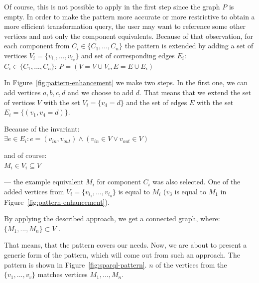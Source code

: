 Of course, this is not possible to apply in the first step since the graph $P$ is empty. 
In order to make the pattern more accurate or more restrictive to obtain a more 
efficient transformation query, the user may want to reference some other 
vertices and not only the component equivalents.
Because of that observation, for each component from $C_i \in \{C_1 ,..., C_n\}$ the pattern is 
extended by adding a set of vertices $V_i = \{v_{i_1}, ..., v_{i_u}\}$ and set of corresponding edges 
$E_i$:\\

{\centering \forall $C_i \in \{C_1 ,..., C_n\}$: $P = (V = V \cup V_i, E = E \cup E_i)$ \\[0.5cm]}

In Figure~\ref{fig:pattern-enhancement} we make two steps. In the first one, we 
can add vertices $a,b,c,d$ and we choose to add $d$. That means that we extend 
the set of vertices $V$ with the set $V_i = \{v_4 = d\}$ and the set of edges $E$ with 
the set $E_i = \{(v_1,v_4 = d)\}$.

Because of the invariant:\\

{\centering $\exists e \in E_i: e = (v_{in}, v_{out}) \land (v_{in} \in V \lor v_{out} \in V)$\\[0.5cm]}

and of course:\\

{\centering $M_i \in V_i \subseteq V$ \\[0.5cm]}

--- the example equivalent $M_i$ for component $C_i$ was also selected. One of the 
added vertices from $V_i = \{v_{i_1}, ..., v_{i_u}\}$ is equal to $M_i$ ($v_3$ is equal to $M_1$
in Figure~\ref{fig:pattern-enhancement}).
   
By applying the described approach, we get a connected graph, where:\\

{\centering $\{M_1, ..., M_n\} \subset V$ .\\[0.5cm]}

That means, that the pattern covers our needs. Now, we are about to present
a generic form of the pattern, which will come out from 
such an approach. The pattern is shown in Figure~\ref{fig:sparql-pattern}. 
$n$ of the vertices from the $\{v_1, ..., v_v\}$ matches vertices $M_1, ..., M_n$.

